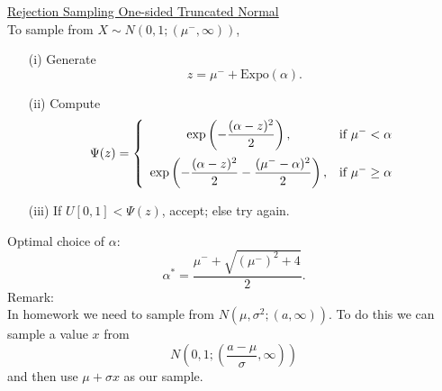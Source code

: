 \documentclass[11pt, oneside]{article}   	%
\begin{document}
\begin{enumerate}
\underline{Rejection Sampling One-sided Truncated Normal} \vspace{0.2cm}\\
To sample from $X\sim N(0,1;(\mu^-,\infty))$,
\begin{itemize}
\item[(i)] Generate
\[
z = \mu^- + \mathrm{Expo}(\alpha).
\]
\item[(ii)] Compute
\[
\Psi(z) = \left\{\begin{array}{cl}
\displaystyle \exp\left(-\frac{(\alpha-z)^2}{2}\right), & \mbox{if   } \mu^- < \alpha  \vspace{0.2cm}\\
\displaystyle \exp\left(-\frac{(\alpha-z)^2}{2}-\frac{(\mu^- - \alpha)^2}{2}\right), & \mbox{if   } \mu^- \geq \alpha
\end{array}\right.
\]
\item[(iii)] If $U[0,1] < \Psi(z)$, accept; else try again. 
\end{itemize}
Optimal choice of $\alpha$: 
\[
\alpha^* = \frac{\mu^- + \sqrt{(\mu^-)^2+4}}{2}.
\]
Remark: \vspace{0.1cm}\\
In homework we need to sample from $N(\mu,\sigma^2;(a,\infty))$. To do this we can sample a value $x$ from
\[
N\left(0,1;\left(\frac{a-\mu}{\sigma},\infty\right)\right)
\]
and then use $\mu+\sigma x$ as our sample.

\end{enumerate}
\end{document}
